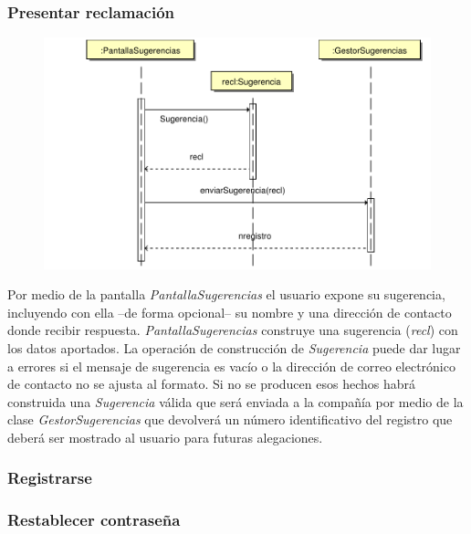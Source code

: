 \documentclass[11pt, a4paper, twoside, titlepage]{article}
\begin{document}
			\subsubsection{Presentar reclamación}
				\begin{figure}[H]\centering
					\includegraphics[scale=.7]{diagramas/presentarreclamacion.pdf}
				\end{figure}

				Por medio de la pantalla {\itshape PantallaSugerencias} el usuario expone su sugerencia, incluyendo con ella --de forma opcional-- su nombre y una dirección de contacto donde recibir respuesta. {\itshape PantallaSugerencias} construye una sugerencia ({\itshape recl}) con los datos aportados. La operación de construcción de {\itshape Sugerencia} puede dar lugar a errores si el mensaje de sugerencia es vacío o la dirección de correo electrónico de contacto no se ajusta al formato. Si no se producen esos hechos habrá construida una {\itshape Sugerencia} válida que será enviada a la compañía por medio de la clase {\itshape GestorSugerencias} que devolverá un número identificativo del registro que deberá ser mostrado al usuario para futuras alegaciones.

			\subsubsection{Registrarse}
				\begin{figure}[H]\centering
				\end{figure}

			\subsubsection{Restablecer contraseña}
				\begin{figure}[H]\centering
				\end{figure}
\end{document}
